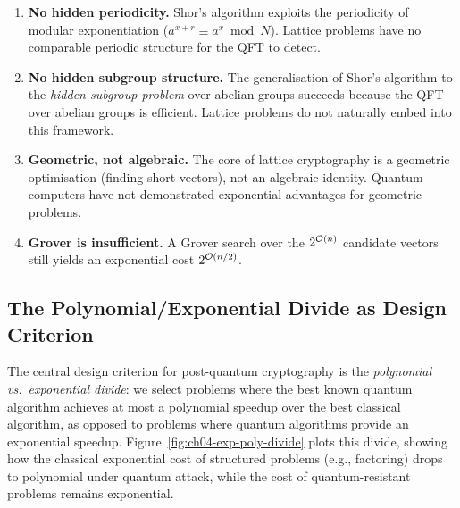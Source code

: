 \begin{enumerate}
\item \textbf{No hidden periodicity.}  Shor's algorithm exploits the periodicity of modular exponentiation ($a^{x+r} \equiv a^x \bmod N$).  Lattice problems have no comparable periodic structure for the QFT to detect.
\item \textbf{No hidden subgroup structure.}  The generalisation of Shor's algorithm to the \emph{hidden subgroup problem} over abelian groups succeeds because the QFT over abelian groups is efficient.  Lattice problems do not naturally embed into this framework.
\item \textbf{Geometric, not algebraic.}  The core of lattice cryptography is a geometric optimisation (finding short vectors), not an algebraic identity.  Quantum computers have not demonstrated exponential advantages for geometric problems.
\item \textbf{Grover is insufficient.}  A Grover search over the $2^{\mathcal{O}(n)}$ candidate vectors still yields an exponential cost $2^{\mathcal{O}(n/2)}$.
\end{enumerate}


\subsection{The Polynomial/Exponential Divide as Design Criterion}
\label{subsec:design-criterion}

The central design criterion for post-quantum cryptography is the \emph{polynomial vs.\ exponential divide}: we select problems where the best known quantum algorithm achieves at most a polynomial speedup over the best classical algorithm, as opposed to problems where quantum algorithms provide an exponential speedup.  Figure~\ref{fig:ch04-exp-poly-divide} plots this divide, showing how the classical exponential cost of structured problems (e.g., factoring) drops to polynomial under quantum attack, while the cost of quantum-resistant problems remains exponential.

